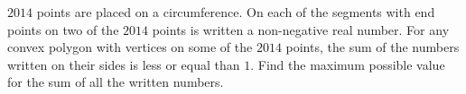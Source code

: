 $2014$ points are placed on a circumference. On each of the segments with end points on two of the $2014$ points is written a non-negative real number. For any convex polygon with vertices on some of the $2014$ points, the sum of the numbers written on their sides is less or equal than $1$. Find the maximum possible value for the sum of all the written numbers.